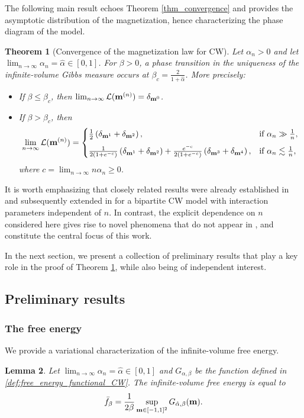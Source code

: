 \documentclass[11pt,oneside]{amsart}
\numberwithin{equation}{section}  %
\theoremstyle{plain}
\newtheorem{theorem}{Theorem}
\newtheorem{lemma}[theorem]{Lemma}
\theoremstyle{remark}
\def \bm {{\bf m}}
\begin{document}
 The following main result echoes Theorem \ref{thm_convergence} and provides the asymptotic distribution of the magnetization, hence characterizing the phase diagram of the model. 
%
\begin{theorem}[Convergence of the magnetization law for CW]\label{thm_convergence_CW}
Let $\alpha_n>0$ and let $\lim_{n \to \infty} \alpha_n = \hat \alpha \in [0,1]$. For $\beta>0$, a phase transition in the uniqueness of the infinite-volume Gibbs measure occurs at 
$\beta_c = \frac{2}{1+\hat{\alpha}}$.
More precisely:
\begin{itemize}
\item[(a)] If $\beta \le \beta_c$, then
$\lim_{n \to \infty} \mathcal{L}(\bm^{(n)}) = \delta_{\bm^0}$.

\item[(b)] If $\beta > \beta_c$, then
\[
\lim_{n \to \infty} \mathcal{L}(\bm^{(n)}) =
\begin{cases}
\frac{1}{2} \left( \delta_{\bm^1} + \delta_{\bm^2} \right), & \text{if } \alpha_n \gg \frac{1}{n}, \\[6pt]
\frac{1}{2(1+e^{-c})} \left( \delta_{\bm^1} + \delta_{\bm^2} \right)
+ \frac{e^{-c}}{2(1+e^{-c})} \left( \delta_{\bm^3} + \delta_{\bm^4} \right),
& \text{if } \alpha_n \lesssim \frac{1}{n},
\end{cases}
\]
where $c = \lim_{n \to \infty} n \alpha_n \ge 0$.
\end{itemize}
\end{theorem}
It is worth emphasizing that closely related results were already established in \cite{C14} and subsequently extended in \cite{KT20, LS18} for a bipartite CW model with interaction parameters independent of $n$.
In contrast, the explicit dependence on $n$ considered here gives rise 
to novel phenomena that do not appear in \cite{C14, KT20, LS18}, and constitute 
the central focus of this work.

In the next section, we present a collection of preliminary results that play a key role in the proof of Theorem \ref{thm_convergence_CW}, while also being of independent interest.

\subsection{Preliminary results}
\subsubsection{The free energy}
We provide a variational characterization of the infinite-volume free energy. 
\begin{lemma}\label{lem:free_energy_CW} 
Let $\lim_{n\to\infty} \alpha_n = \hat \alpha \in [0,1]$ and $G_{\alpha,\beta}$ be the function defined in \eqref{def:free_energy_functional_CW}.
The infinite-volume free energy is equal to
\begin{align*}
    \bar{f}_{\beta}=\frac{1}{2 \beta}\sup_{\bm \in [-1,1]^2} G_{\hat\alpha,\beta}(\bm).
\end{align*}
\end{lemma}
\end{document}
